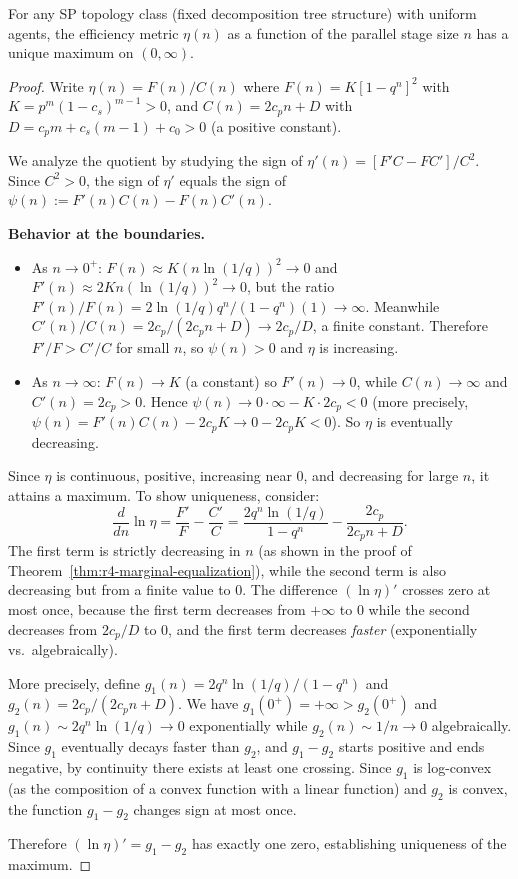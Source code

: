 \begin{theorem}
\label{thm:r4-efficiency-max}
For any SP topology class (fixed decomposition tree structure) with uniform
agents, the efficiency metric $\eta(n)$ as a function of the parallel stage
size $n$ has a unique maximum on $(0, \infty)$.
\end{theorem}

\begin{proof}
Write $\eta(n) = F(n)/C(n)$ where $F(n) = K[1 - q^n]^2$ with
$K = p^m(1-c_s)^{m-1} > 0$, and $C(n) = 2c_p n + D$ with $D = c_p m + c_s(m-1) + c_0 > 0$
(a positive constant).

We analyze the quotient by studying the sign of $\eta'(n) = [F'C - FC']/C^2$.
Since $C^2 > 0$, the sign of $\eta'$ equals the sign of $\psi(n) := F'(n)C(n) - F(n)C'(n)$.

\medskip\noindent
\textbf{Behavior at the boundaries.}
\begin{itemize}
  \item As $n \to 0^+$: $F(n) \approx K(n \ln(1/q))^2 \to 0$ and
    $F'(n) \approx 2K n(\ln(1/q))^2 \to 0$, but the ratio
    $F'(n)/F(n) = 2\ln(1/q)q^n/(1-q^n)(1) \to \infty$.
    Meanwhile $C'(n)/C(n) = 2c_p/(2c_p n + D) \to 2c_p/D$, a finite constant.
    Therefore $F'/F > C'/C$ for small $n$, so $\psi(n) > 0$ and $\eta$ is increasing.
  \item As $n \to \infty$: $F(n) \to K$ (a constant) so $F'(n) \to 0$, while
    $C(n) \to \infty$ and $C'(n) = 2c_p > 0$.  Hence $\psi(n) \to 0 \cdot \infty - K \cdot 2c_p < 0$
    (more precisely, $\psi(n) = F'(n)C(n) - 2c_p K \to 0 - 2c_p K < 0$).
    So $\eta$ is eventually decreasing.
\end{itemize}

Since $\eta$ is continuous, positive, increasing near $0$, and decreasing for large
$n$, it attains a maximum.  To show uniqueness, consider:
\[
  \frac{d}{dn}\ln\eta = \frac{F'}{F} - \frac{C'}{C}
  = \frac{2q^n \ln(1/q)}{1-q^n} - \frac{2c_p}{2c_p n + D}.
\]
The first term is strictly decreasing in $n$ (as shown in the proof of
Theorem~\ref{thm:r4-marginal-equalization}), while the second term is also
decreasing but from a finite value to $0$.  The difference $(\ln\eta)'$
crosses zero at most once, because the first term decreases from $+\infty$
to $0$ while the second decreases from $2c_p/D$ to $0$, and
the first term decreases \emph{faster} (exponentially vs.\ algebraically).

More precisely, define $g_1(n) = 2q^n\ln(1/q)/(1-q^n)$ and
$g_2(n) = 2c_p/(2c_p n + D)$.  We have $g_1(0^+) = +\infty > g_2(0^+)$
and $g_1(n) \sim 2q^n\ln(1/q) \to 0$ exponentially while
$g_2(n) \sim 1/n \to 0$ algebraically.  Since $g_1$ eventually decays faster
than $g_2$, and $g_1 - g_2$ starts positive and ends negative, by
continuity there exists at least one crossing.  Since $g_1$ is log-convex
(as the composition of a convex function with a linear function) and $g_2$
is convex, the function $g_1 - g_2$ changes sign at most once.

Therefore $(\ln\eta)' = g_1 - g_2$ has exactly one zero, establishing
uniqueness of the maximum.
\end{proof}


